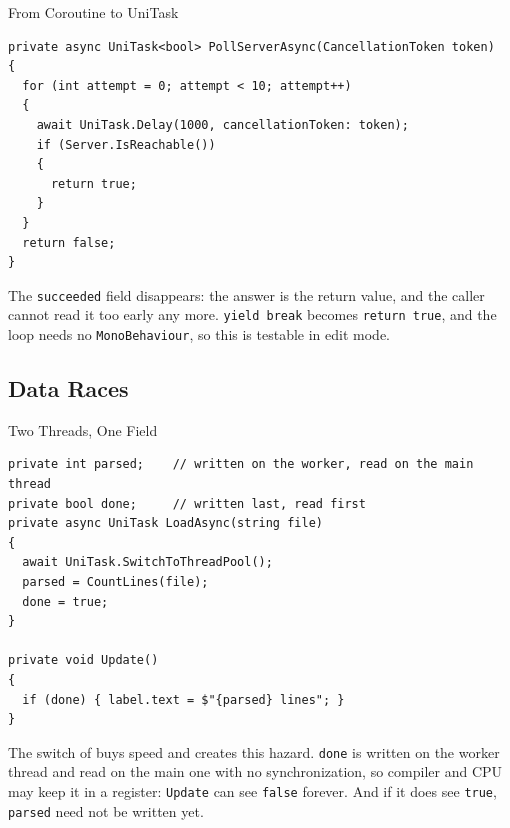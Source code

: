 \begin{solutionframe}{From Coroutine to UniTask}
  \begin{lstlisting}[basicstyle=\scriptsize\ttfamily]
private async UniTask<bool> PollServerAsync(CancellationToken token)
{
  for (int attempt = 0; attempt < 10; attempt++)
  {
    await UniTask.Delay(1000, cancellationToken: token);
    if (Server.IsReachable())
    {
      return true;
    }
  }
  return false;
}
  \end{lstlisting}
  \vspace{1ex}

  The \texttt{succeeded} field disappears: the answer is the return value, and
  the caller cannot read it too early any more. \texttt{yield break} becomes
  \texttt{return true}, and the loop needs no \texttt{MonoBehaviour}, so this
  is testable in edit mode.
  \vspace{1ex}

\end{solutionframe}

\subsection{Data Races}

\begin{frame}[fragile]{Two Threads, One Field}
  \begin{lstlisting}[basicstyle=\scriptsize\ttfamily]
private int parsed;    // written on the worker, read on the main thread
private bool done;     // written last, read first
private async UniTask LoadAsync(string file)
{
  await UniTask.SwitchToThreadPool();
  parsed = CountLines(file);
  done = true;
}

private void Update()
{
  if (done) { label.text = $"{parsed} lines"; }
}
  \end{lstlisting}
  \vspace{1ex}

  The switch of  buys speed and creates this
  hazard. \texttt{done} is written on the worker thread and read on the main
  one with no synchronization, so compiler and CPU may keep it in a register:
  \texttt{Update} can see \texttt{false} forever. And if it does see
  \texttt{true}, \texttt{parsed} need not be written yet.
\end{frame}

